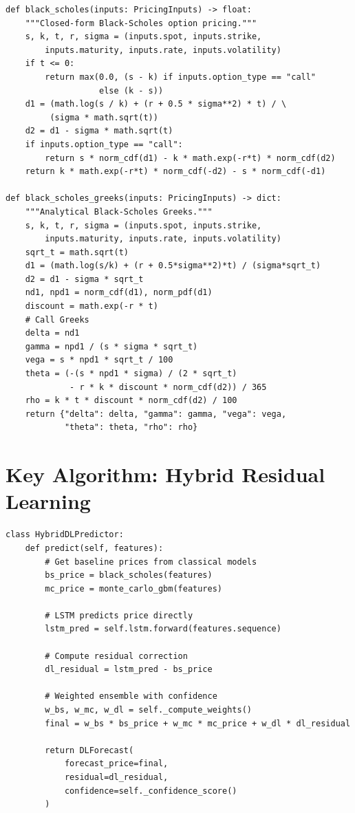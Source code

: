 \documentclass[12pt,a4paper]{report}
\begin{document}
\begin{lstlisting}[style=pythonstyle, caption={Complete Black-Scholes Implementation with Greeks}, label={lst:bs-full}]
def black_scholes(inputs: PricingInputs) -> float:
    """Closed-form Black-Scholes option pricing."""
    s, k, t, r, sigma = (inputs.spot, inputs.strike,
        inputs.maturity, inputs.rate, inputs.volatility)
    if t <= 0:
        return max(0.0, (s - k) if inputs.option_type == "call"
                   else (k - s))
    d1 = (math.log(s / k) + (r + 0.5 * sigma**2) * t) / \
         (sigma * math.sqrt(t))
    d2 = d1 - sigma * math.sqrt(t)
    if inputs.option_type == "call":
        return s * norm_cdf(d1) - k * math.exp(-r*t) * norm_cdf(d2)
    return k * math.exp(-r*t) * norm_cdf(-d2) - s * norm_cdf(-d1)

def black_scholes_greeks(inputs: PricingInputs) -> dict:
    """Analytical Black-Scholes Greeks."""
    s, k, t, r, sigma = (inputs.spot, inputs.strike,
        inputs.maturity, inputs.rate, inputs.volatility)
    sqrt_t = math.sqrt(t)
    d1 = (math.log(s/k) + (r + 0.5*sigma**2)*t) / (sigma*sqrt_t)
    d2 = d1 - sigma * sqrt_t
    nd1, npd1 = norm_cdf(d1), norm_pdf(d1)
    discount = math.exp(-r * t)
    # Call Greeks
    delta = nd1
    gamma = npd1 / (s * sigma * sqrt_t)
    vega = s * npd1 * sqrt_t / 100
    theta = (-(s * npd1 * sigma) / (2 * sqrt_t)
             - r * k * discount * norm_cdf(d2)) / 365
    rho = k * t * discount * norm_cdf(d2) / 100
    return {"delta": delta, "gamma": gamma, "vega": vega,
            "theta": theta, "rho": rho}
\end{lstlisting}

\section{Key Algorithm: Hybrid Residual Learning}

\begin{lstlisting}[style=pythonstyle, caption={Hybrid DL Predictor with Residual Correction}, label={lst:hybrid}]
class HybridDLPredictor:
    def predict(self, features):
        # Get baseline prices from classical models
        bs_price = black_scholes(features)
        mc_price = monte_carlo_gbm(features)

        # LSTM predicts price directly
        lstm_pred = self.lstm.forward(features.sequence)

        # Compute residual correction
        dl_residual = lstm_pred - bs_price

        # Weighted ensemble with confidence
        w_bs, w_mc, w_dl = self._compute_weights()
        final = w_bs * bs_price + w_mc * mc_price + w_dl * dl_residual

        return DLForecast(
            forecast_price=final,
            residual=dl_residual,
            confidence=self._confidence_score()
        )
\end{lstlisting}
\end{document}
